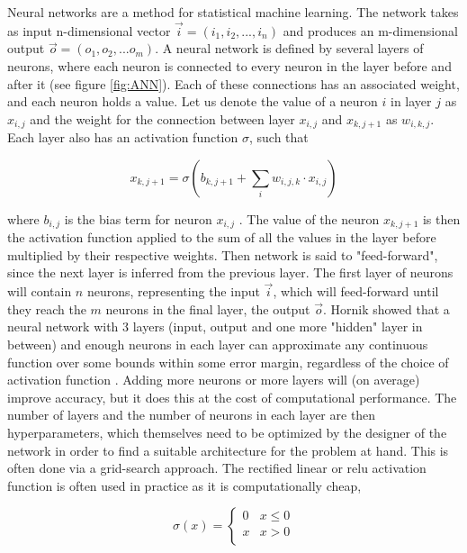 Neural networks are a method for statistical machine learning. The network takes as input n-dimensional vector $\vec{i} = (i_1, i_2, ..., i_n)$ and produces an m-dimensional output $\vec{o} = (o_1, o_2, ...o_m)$. A neural network is defined by several layers of neurons, where each neuron is connected to every neuron in the layer before and after it (see figure \ref{fig:ANN}). Each of these connections has an associated weight, and each neuron holds a value. Let us denote the value of a neuron $i$ in layer $j$ as $x_{i,j}$ and the weight for the connection between layer $x_{i,j}$ and $x_{k, j+1}$ as $w_{i,k,j}$. Each layer also has an activation function $\sigma$, such that 

\begin{equation}
x_{k,j+1} = \sigma (b_{k,j+1} + \sum_{i} w_{i,j,k} \cdot x_{i, j}) 
\end{equation}

where $b_{i,j}$ is the bias term for neuron $x_{i,j}$ \cite{feedForwardApprox}. 
The value of the neuron $x_{k,j+1}$ is then the activation function applied to the sum of all the values in the layer before multiplied by their respective weights. Then network is said to "feed-forward", since the next layer is inferred from the previous layer. The first layer of neurons will contain $n$ neurons, representing the input $\vec{i}$, which will feed-forward until they reach the $m$ neurons in the final layer, the output $\vec{o}$. Hornik showed that a neural network with 3 layers (input, output and one more "hidden" layer in between) and enough neurons in each layer can approximate any continuous function over some bounds within some error margin, regardless of the choice of activation function \cite{feedForwardApprox}. Adding more neurons or more layers will (on average) improve accuracy, but it does this at the cost of computational performance. The number of layers and the number of neurons in each layer are then hyperparameters, which themselves need to be optimized by the designer of the network in order to find a suitable architecture for the problem at hand. This is often done via a grid-search approach. The rectified linear or relu activation function is often used in practice as it is computationally cheap, 

\begin{equation} \sigma(x) = \begin{cases} 
      0 & x \leq 0 \\
      x &  x > 0 \\
   \end{cases}
\end{equation}


